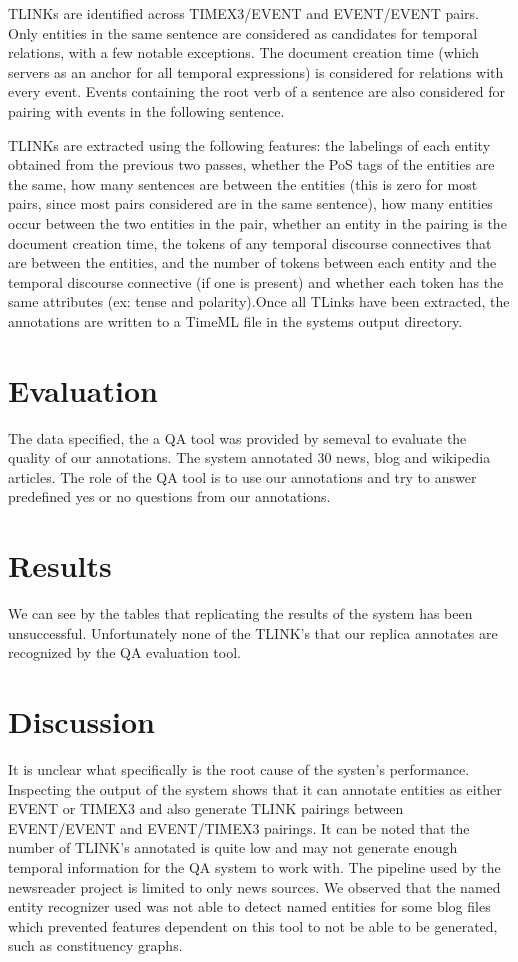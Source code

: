 \documentclass[11pt,letterpaper]{article}
\begin{document}
TLINKs are identified across TIMEX3/EVENT and EVENT/EVENT pairs. Only entities in the same sentence are considered as candidates for temporal relations, with a few notable exceptions. The document creation time (which servers as an anchor for all temporal expressions) is considered for relations with every event. Events containing the root verb of a sentence are also considered for pairing with events in the following sentence.

TLINKs are extracted using the following features: the labelings of each entity obtained from the previous two passes, whether the PoS tags of the entities are the same, how many sentences are between the entities (this is zero for most pairs, since most pairs considered are in the same sentence), how many entities occur between the two entities in the pair, whether an entity in the pairing is the document creation time, the tokens of any temporal discourse connectives that are between the entities, and the number of tokens between each entity and the temporal discourse connective (if one is present) and whether each token has the same attributes (ex: tense and polarity).Once all TLinks have been extracted, the annotations are written to a TimeML file in the systems output directory.

\section{Evaluation}

The data specified, the a QA tool was provided by semeval to evaluate the quality of our annotations. The system annotated 30 news, blog and wikipedia articles. The role of the QA tool is to use our annotations and try to answer predefined yes or no questions from our annotations.

\section{Results}

We can see by the tables that replicating the results of the system has been unsuccessful. Unfortunately none of the TLINK's that our replica annotates are recognized by the QA evaluation tool.

\section{Discussion}

It is unclear what specifically is the root cause of the systen's performance. Inspecting the output of the system shows that it can annotate entities as either EVENT or TIMEX3 and also generate TLINK pairings between EVENT/EVENT and EVENT/TIMEX3 pairings. It can be noted that the number of TLINK's annotated is quite low and may not generate enough temporal information for the QA system to work with.
The pipeline used by the newsreader project is limited to only news sources. We observed that the named entity recognizer used was not able to detect named entities for some blog files which prevented features dependent on this tool to not be able to be generated, such as constituency graphs.
\end{document}
